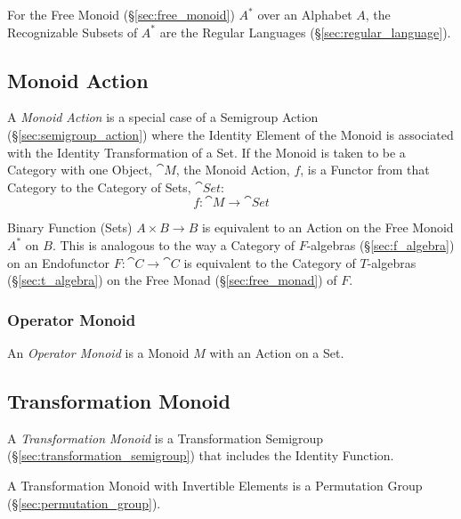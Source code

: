 For the Free Monoid (\S\ref{sec:free_monoid}) $A^*$ over an Alphabet
$A$, the Recognizable Subsets of $A^*$ are the Regular Languages
(\S\ref{sec:regular_language}).



\subsection{Monoid Action}\label{sec:monoid_action}

A \emph{Monoid Action} is a special case of a Semigroup Action
(\S\ref{sec:semigroup_action}) where the Identity Element of the
Monoid is associated with the Identity Transformation of a Set. If the
Monoid is taken to be a Category with one Object, $\cat{M}$, the
Monoid Action, $f$, is a Functor from that Category to the Category of
Sets, $\cat{Set}$:
\[
  f : \cat{M} \rightarrow \cat{Set}
\]

Binary Function (Sets) $A \times B \rightarrow B$ is equivalent to an
Action on the Free Monoid $A^*$ on $B$. This is analogous to the way a
Category of $F$-algebras (\S\ref{sec:f_algebra}) on an Endofunctor $F
: \cat{C} \rightarrow \cat{C}$ is equivalent to the Category of
$T$-algebras (\S\ref{sec:t_algebra}) on the Free Monad
(\S\ref{sec:free_monad}) of $F$.



\subsubsection{Operator Monoid}\label{sec:operator_monoid}

An \emph{Operator Monoid} is a Monoid $M$ with an Action on a Set.



\subsection{Transformation Monoid}\label{sec:transformation_monoid}

A \emph{Transformation Monoid} is a Transformation Semigroup
(\S\ref{sec:transformation_semigroup}) that includes the Identity
Function.

A Transformation Monoid with Invertible Elements is a Permutation
Group (\S\ref{sec:permutation_group}).

